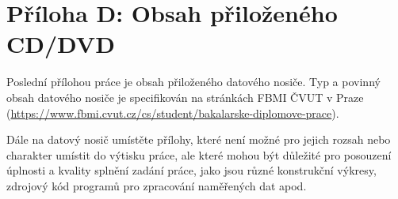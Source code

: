 \clearpage

\section*{Příloha D: Obsah přiloženého CD/DVD}
    \label{app:obsah}
    
    Poslední přílohou práce je obsah přiloženého datového nosiče. 
    Typ a povinný obsah datového nosiče je specifikován na stránkách FBMI ČVUT v Praze (\url{https://www.fbmi.cvut.cz/cs/student/bakalarske-diplomove-prace}).
    
    Dále na datový nosič umístěte přílohy, které není možné pro jejich rozsah nebo charakter umístit do výtisku práce, ale které mohou být důležité pro posouzení úplnosti a kvality splnění zadání práce, jako jsou různé konstrukční výkresy, zdrojový kód programů pro zpracování naměřených dat apod.
